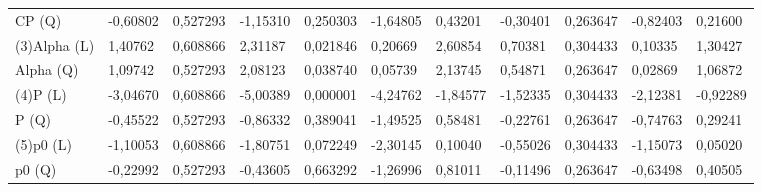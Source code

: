 \begin{table}[H]
{\begin{tabular}{lllllllllll}
CP      (Q)    & {\color[HTML]{181A1B} -0,60802} & {\color[HTML]{181A1B} 0,527293} & {\color[HTML]{181A1B} -1,15310} & {\color[HTML]{181A1B} 0,250303} & {\color[HTML]{181A1B} -1,64805} & {\color[HTML]{181A1B} 0,43201}  & {\color[HTML]{181A1B} -0,30401} & {\color[HTML]{181A1B} 0,263647} & {\color[HTML]{181A1B} -0,82403} & {\color[HTML]{181A1B} 0,21600}  \\
\rowcolor[HTML]{FFFFFF} 
(3)Alpha   (L) & {\color[HTML]{FF0000} 1,40762}  & {\color[HTML]{FF0000} 0,608866} & {\color[HTML]{FF0000} 2,31187}  & {\color[HTML]{FF0000} 0,021846} & {\color[HTML]{FF0000} 0,20669}  & {\color[HTML]{FF0000} 2,60854}  & {\color[HTML]{FF0000} 0,70381}  & {\color[HTML]{FF0000} 0,304433} & {\color[HTML]{FF0000} 0,10335}  & {\color[HTML]{FF0000} 1,30427}  \\
\rowcolor[HTML]{FFFFFF} 
Alpha   (Q)    & {\color[HTML]{FF0000} 1,09742}  & {\color[HTML]{FF0000} 0,527293} & {\color[HTML]{FF0000} 2,08123}  & {\color[HTML]{FF0000} 0,038740} & {\color[HTML]{FF0000} 0,05739}  & {\color[HTML]{FF0000} 2,13745}  & {\color[HTML]{FF0000} 0,54871}  & {\color[HTML]{FF0000} 0,263647} & {\color[HTML]{FF0000} 0,02869}  & {\color[HTML]{FF0000} 1,06872}  \\
\rowcolor[HTML]{FFFFFF} 
(4)P       (L) & {\color[HTML]{FF0000} -3,04670} & {\color[HTML]{FF0000} 0,608866} & {\color[HTML]{FF0000} -5,00389} & {\color[HTML]{FF0000} 0,000001} & {\color[HTML]{FF0000} -4,24762} & {\color[HTML]{FF0000} -1,84577} & {\color[HTML]{FF0000} -1,52335} & {\color[HTML]{FF0000} 0,304433} & {\color[HTML]{FF0000} -2,12381} & {\color[HTML]{FF0000} -0,92289} \\
\rowcolor[HTML]{FFFFFF} 
P       (Q)    & {\color[HTML]{181A1B} -0,45522} & {\color[HTML]{181A1B} 0,527293} & {\color[HTML]{181A1B} -0,86332} & {\color[HTML]{181A1B} 0,389041} & {\color[HTML]{181A1B} -1,49525} & {\color[HTML]{181A1B} 0,58481}  & {\color[HTML]{181A1B} -0,22761} & {\color[HTML]{181A1B} 0,263647} & {\color[HTML]{181A1B} -0,74763} & {\color[HTML]{181A1B} 0,29241}  \\
\rowcolor[HTML]{FFFFFF} 
(5)p0      (L) & {\color[HTML]{181A1B} -1,10053} & {\color[HTML]{181A1B} 0,608866} & {\color[HTML]{181A1B} -1,80751} & {\color[HTML]{181A1B} 0,072249} & {\color[HTML]{181A1B} -2,30145} & {\color[HTML]{181A1B} 0,10040}  & {\color[HTML]{181A1B} -0,55026} & {\color[HTML]{181A1B} 0,304433} & {\color[HTML]{181A1B} -1,15073} & {\color[HTML]{181A1B} 0,05020}  \\
\rowcolor[HTML]{FFFFFF} 
p0      (Q)    & {\color[HTML]{181A1B} -0,22992} & {\color[HTML]{181A1B} 0,527293} & {\color[HTML]{181A1B} -0,43605} & {\color[HTML]{181A1B} 0,663292} & {\color[HTML]{181A1B} -1,26996} & {\color[HTML]{181A1B} 0,81011}  & {\color[HTML]{181A1B} -0,11496} & {\color[HTML]{181A1B} 0,263647} & {\color[HTML]{181A1B} -0,63498} & {\color[HTML]{181A1B} 0,40505}  \\

\end{tabular}}
\end{table}
